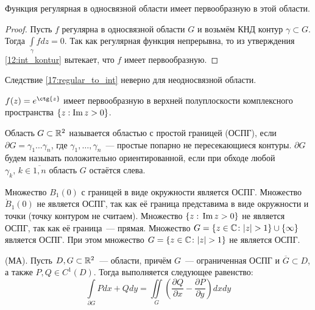 \begin{corollary} \label{17:regular_to_int}
    Функция регулярная в односвязной области имеет первообразную в этой области.
\end{corollary}

\begin{proof}
    Пусть \(f\) регулярна в односвязной области \(G\) и возьмём КНД контур \(\gamma \subset G\).
    Тогда \(\int\limits_\gamma f dz = 0\). Так как регулярная функция непрерывна, то из утверждения
    \ref{12:int_kontur} вытекает, что \(f\) имеет первообразную.
\end{proof}

\begin{note}
    Следствие \ref{17:regular_to_int} неверно для неодносвязной области.
\end{note}

\begin{example}
    \(f(z) = e^{\ctg{z}}\) имеет первообразную в верхней полуплоскости комплексного пространства
     \(\{z: \operatorname{Im} z > 0\}\).
\end{example}

\begin{definition}
    Область \(G \subset \mathbb{R}^2\) называется областью с простой границей (ОСПГ), если \(\partial G =
    \gamma_1 \dots \gamma_n\), где \(\gamma_1, \dots, \gamma_n\)~--- простые попарно не
    пересекающиеся контуры. \(\partial G\) будем называть положительно ориентированной, если при
    обходе любой \(\gamma_k, \, k \in \overline{1,n}\) область \(G\) остаётся слева.
\end{definition}

\begin{example}
    Множество \(B_1(0)\) с границей в виде окружности является ОСПГ. Множество \(\mathring{B}_1(0)\)
    не является ОСПГ, так как её граница представима в виде окружности и точки (точку контуром не
    считаем). Множество \(\{z: \, \operatorname{Im} z > 0\}\) не является ОСПГ, так как её граница~--- прямая.
    Множество \(G = \{z \in \mathbb{C} \colon |z| > 1\} \cup \{\infty\}\) является ОСПГ. При этом множество
    \(G = \{z \in \mathbb{C} \colon |z| > 1\} \) не является ОСПГ.
\end{example}

\begin{theorem} \label{17:ma_2}
    (МА). Пусть \(D, G \subset \mathbb{R}^2\)~--- области, причём \(G\)~--- ограниченная ОСПГ и
    \(\overline{G} \subset D\), а также \(P, Q \in C^1(D)\). Тогда выполняется следующее равенство:
    \[\int\limits_{\partial G} Pdx + Qdy = \iint\limits_G \left(\dfrac{\partial Q}{\partial x} -
    \dfrac{\partial P}{\partial y}\right)dxdy\]
\end{theorem}

